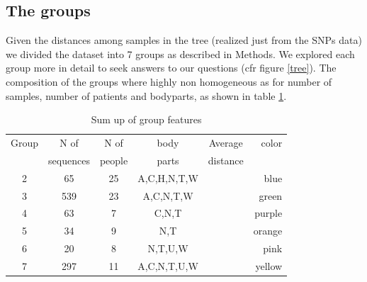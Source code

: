 \documentclass[12pt,a4paper]{article}
\begin{document}
\subsection{The groups}
Given the distances among samples in the tree (realized just from the SNPs data) we divided the dataset into 7 groups as described in Methods. We explored each group more in detail to seek answers to our questions (cfr figure \ref{tree}). The composition of the groups where highly non homogeneous as for number of samples, number of patients and bodyparts, as shown in table \ref{tab:groups}.



\begin{table}
\begin{center}

\begin{tabular}{c*{4}{c}r}
Group            & N of & N of & body & Average & color  \\
			& sequences & people & parts & distance &    \\
\hline
2 & 65 & 25 & A,C,H,N,T,W &  & blue \\
3     & 539 & 23 & A,C,N,T,W &  & green  \\
4      & 63 & 7 & C,N,T &  &  purple  \\
5   & 34 & 9 & N,T &  & orange   \\
6    & 20 & 8 & N,T,U,W &  & pink  \\
7    & 297 & 11 & A,C,N,T,U,W &  &  yellow  \\
\end{tabular}
 \caption{Sum up of group features}
  \label{tab:groups}
\end{center}

\end{table}

\end{document}
